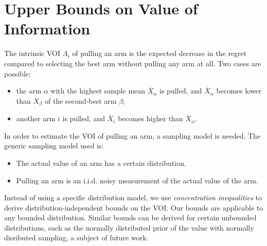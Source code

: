 \documentclass[]{article}
\begin{document}
\section{Upper Bounds on Value of Information}

The intrinsic VOI $\Lambda_i$ of pulling an arm is the expected decrease
in the regret compared to selecting the best arm without pulling any arm at
all. Two cases are possible:
\begin{itemize}
\item the arm $\alpha$ with the highest sample mean $\overline
  X_\alpha$ is pulled, and $\overline X_\alpha$ becomes lower than
  $\overline X_\beta$ of the second-best arm $\beta$;
\item another arm $i$ is pulled, and $\overline X_i$ becomes higher
than $\overline X_\alpha$.
\end{itemize}

In order to estimate the VOI of pulling an arm, a sampling model is
needed.  The generic sampling model used is: 
\begin{itemize}
\item The actual value of an arm has a certain distribution.
\item Pulling an arm is an i.i.d. noisy measurement of the actual
  value of the arm.
\end{itemize}
Instead of using a specific distribution model, we use {\em concentration
inequalities} to derive distribution-independent bounds on the
VOI. Our bounds are applicable to any bounded distribution. Similar
bounds can be derived for certain unbounded distributions, such as the
normally distributed prior of the value with normally disributed
sampling, a subject of future work.
\end{document}
